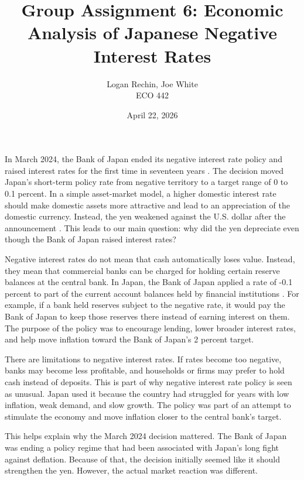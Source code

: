 \documentclass[12pt]{article}
\begin{document}
\title{Group Assignment 6: Economic Analysis of Japanese Negative Interest Rates\\[0.5em]}
\author{Logan Rechin, Joe White\\ECO 442}
\date{April 22, 2026}
\maketitle

In March 2024, the Bank of Japan ended its negative interest rate policy and raised interest rates for the first time in seventeen years \citep{boj2024statement}. The decision moved Japan's short-term policy rate from negative territory to a target range of 0 to 0.1 percent. In a simple asset-market model, a higher domestic interest rate should make domestic assets more attractive and lead to an appreciation of the domestic currency. Instead, the yen weakened against the U.S. dollar after the announcement \citep{reuters2024yen}. This leads to our main question: why did the yen depreciate even though the Bank of Japan raised interest rates?

Negative interest rates do not mean that cash automatically loses value. Instead, they mean that commercial banks can be charged for holding certain reserve balances at the central bank. In Japan, the Bank of Japan applied a rate of -0.1 percent to part of the current account balances held by financial institutions \citep{boj2024minutes}. For example, if a bank held reserves subject to the negative rate, it would pay the Bank of Japan to keep those reserves there instead of earning interest on them. The purpose of the policy was to encourage lending, lower broader interest rates, and help move inflation toward the Bank of Japan's 2 percent target.

There are limitations to negative interest rates. If rates become too negative, banks may become less profitable, and households or firms may prefer to hold cash instead of deposits. This is part of why negative interest rate policy is seen as unusual. Japan used it because the country had struggled for years with low inflation, weak demand, and slow growth. The policy was part of an attempt to stimulate the economy and move inflation closer to the central bank's target.

This helps explain why the March 2024 decision mattered. The Bank of Japan was ending a policy regime that had been associated with Japan's long fight against deflation. Because of that, the decision initially seemed like it should strengthen the yen. However, the actual market reaction was different.
\end{document}
